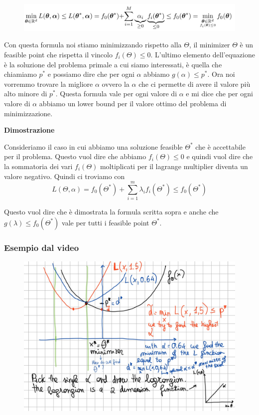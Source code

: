 \documentclass[14pt]{extreport}
\begin{document}
\begin{figure}[H]
\centering
\includegraphics[width=\linewidth]{301.jpeg}
\end{figure}

Con questa formula noi stiamo minimizzando rispetto alla $\Theta$, il minimizer $\Theta$ è un feasible point che rispetta il vincolo $f_i(\Theta) \leq
0$. L'ultimo elemento dell'equazione è la soluzione del problema primale a cui siamo interessati, è quella che chiamiamo $p^*$ e possiamo dire che per
ogni $\alpha$ abbiamo $g(\alpha) \leq p^*$. Ora noi vorremmo trovare la migliore $\alpha$ ovvero la $\alpha$ che ci permette di avere il valore più
alto minore di $p^*$. Questa formula vale per ogni valore di $\alpha$ e mi dice che per ogni valore di $\alpha$ abbiamo un lower bound per il valore
ottimo del problema di minimizzazione.

\textbf{Dimostrazione}

Consideriamo il caso in cui abbiamo una soluzione feasible $\Theta^*$ che è accettabile per il problema. Questo vuol dire che abbiamo $f_i(\Theta)
\leq 0$ e quindi vuol dire che la sommatoria dei vari $f_i(\Theta)$ moltiplicati per il lagrange multiplier diventa un valore negativo. Quindi ci
troviamo con $$L(\Theta, \alpha) = f_0(\Theta^*) + \sum_{i=1}^m \lambda_i f_i(\Theta^*) \leq f_0(\Theta^*)$$

Questo vuol dire che è dimostrata la formula scritta sopra e anche che $g(\lambda) \leq f_0(\Theta^*)$ vale per tutti i feasible point $\Theta^*$.


\subsubsection{Esempio dal video}

\begin{figure}[H]
\centering
\includegraphics[width=0.7\linewidth]{306.jpeg}
\end{figure}
\end{document}
